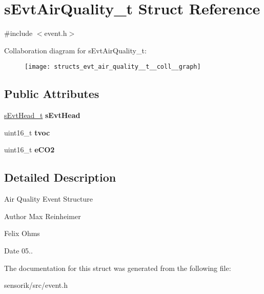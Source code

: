 \hypertarget{structs_evt_air_quality__t}{}\section{s\+Evt\+Air\+Quality\+\_\+t Struct Reference}
\label{structs_evt_air_quality__t}


{\ttfamily \#include $<$event.\+h$>$}



Collaboration diagram for s\+Evt\+Air\+Quality\+\_\+t\+:\nopagebreak
\begin{figure}[H]
\begin{center}
\leavevmode
\texttt{[image: structs\_evt\_air\_quality\_\_t\_\_coll\_\_graph]}
\end{center}
\end{figure}
\subsection*{Public Attributes}
\begin{DoxyCompactItemize}
\item 
\mbox{\label{structs_evt_air_quality__t_a3352fabead8f887166d94e47c2e0077c}} 
\mbox{\hyperlink{structs_evt_head__t}{s\+Evt\+Head\+\_\+t}} {\bfseries s\+Evt\+Head}
\item 
\mbox{\label{structs_evt_air_quality__t_a88fe0c1d1505eb0c2052ecc939f03b32}} 
uint16\+\_\+t {\bfseries tvoc}
\item 
\mbox{\label{structs_evt_air_quality__t_a3b755b7d6d6c90c8b9b3cfaa4cc8c2f6}} 
uint16\+\_\+t {\bfseries e\+C\+O2}
\end{DoxyCompactItemize}


\subsection{Detailed Description}
Air Quality Event Structure

\begin{DoxyAuthor}{Author}
Max Reinheimer 

Felix Ohms 
\end{DoxyAuthor}
\begin{DoxyDate}{Date}
05.. 
\end{DoxyDate}


The documentation for this struct was generated from the following file\+:\begin{DoxyCompactItemize}
\item 
sensorik/src/event.\+h\end{DoxyCompactItemize}

